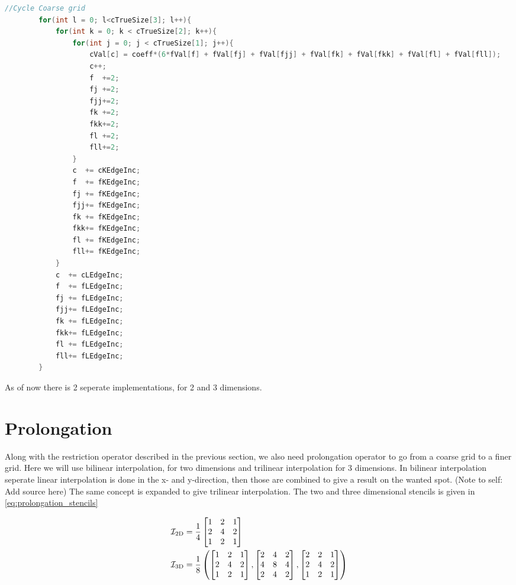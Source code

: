	\newpage
	\begin{lstlisting}[language=c, caption = The foor loop doing the calculations]
		//Cycle Coarse grid
		for(int l = 0; l<cTrueSize[3]; l++){
			for(int k = 0; k < cTrueSize[2]; k++){
				for(int j = 0; j < cTrueSize[1]; j++){
					cVal[c] = coeff*(6*fVal[f] + fVal[fj] + fVal[fjj] + fVal[fk] + fVal[fkk] + fVal[fl] + fVal[fll]);
					c++;
					f  +=2;
					fj +=2;
					fjj+=2;
					fk +=2;
					fkk+=2;
					fl +=2;
					fll+=2;
				}
				c  += cKEdgeInc;
				f  += fKEdgeInc;
				fj += fKEdgeInc;
				fjj+= fKEdgeInc;
				fk += fKEdgeInc;
				fkk+= fKEdgeInc;
				fl += fKEdgeInc;
				fll+= fKEdgeInc;
			}
			c  += cLEdgeInc;
			f  += fLEdgeInc;
			fj += fLEdgeInc;
			fjj+= fLEdgeInc;
			fk += fLEdgeInc;
			fkk+= fLEdgeInc;
			fl += fLEdgeInc;
			fll+= fLEdgeInc;
		}
	\end{lstlisting}

	As of now there is 2 seperate implementations, for 2 and 3 dimensions.

\section{Prolongation}
	Along with the restriction operator described in the previous section, we also need prolongation
	operator to go from a coarse grid to a finer grid.	Here we will use bilinear interpolation, for
	two dimensions and trilinear interpolation for 3 dimensions. In bilinear interpolation seperate
	linear interpolation is done in the x- and y-direction, then those are combined to give a result
	on the wanted spot. (Note to self: Add source here) The same concept is expanded to give trilinear
	interpolation. The two and three dimensional stencils is given in \eqref{eq:prolongation_stencils}


	\begin{equation}
		\centering
		\begin{aligned}
			\mathcal{I}_{2\text{D}} &= \frac{1}{4}
			\begin{bmatrix}
				1 & 2 & 1
				\\
				2 & 4 & 2
				\\
				1 & 2 & 1
			\end{bmatrix}
			\\
			\mathcal{I}_{3\text{D}} &= \frac{1}{8} \left(
			\begin{bmatrix}
				1 & 2 & 1
				\\
				2 & 4 & 2
				\\
				1 & 2 & 1
			\end{bmatrix}
			,
			\begin{bmatrix}
				2 & 4 & 2
				\\
				4 & 8 & 4
				\\
				2 & 4 & 2
			\end{bmatrix}
			,
			\begin{bmatrix}
				2 & 2 & 1
				\\
				2 & 4 & 2
				\\
				1 & 2 & 1
			\end{bmatrix}
			\right)
			\label{eq:prolongation_stencils}
		\end{aligned}
	\end{equation}

